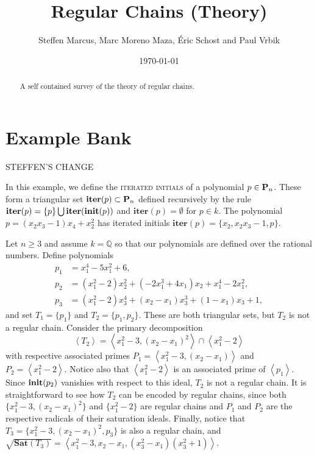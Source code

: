\documentclass[12pt]{article}
\title{Regular Chains (Theory)}
\author{Steffen Marcus, Marc Moreno Maza, \'Eric Schost and Paul Vrbik}
\date{\today}
\newcommand{\Emph}[1]{\textsc{#1}}
\begin{document}
\maketitle


\begin{abstract}
A self contained survey of the theory of regular chains.
\end{abstract}

\section*{Example Bank}
STEFFEN'S CHANGE
\begin{example}  
In this example, we define the \Emph{iterated initials} of a polynomial $p\in\mathbf{P}_n$.  These form a triangular set $\textbf{iter}(p)\subset \mathbf{P}_n$ defined recursively by the rule $\textbf{iter}(p)=\{p\}\bigcup\textbf{iter}(\textbf{init}(p))$ and $\textbf{iter}(p) = \emptyset$ for $p\in k$.  The polynomial $p=(x_2x_3-1)x_4+x_2^2$ has iterated initials $\textbf{iter}(p)=\{x_2,x_2x_3-1,p\}$.
\end{example}

\begin{example}   
Let $n\geq 3$ and assume $k=\mathbb{Q}$ so that our polynomials are defined over the rational numbers.  Define polynomials
\begin{align*}
p_1 &= x_1^4-5x_1^2+6,\\
p_2 &=(x_1^2-2)x_2^2+(-2x_1^3+4x_1)x_2+x_1^4-2x_1^2,\\
p_3 &=(x_1^2-2)x_3^4+(x_2-x_1)x_3^3+(1-x_1)x_3+1,
\end{align*}
and set $T_1=\{p_1\}$ and $T_2=\{p_1,p_2\}$.  These are both triangular sets, but $T_2$ is not a regular chain.  Consider the primary decomposition
\[
\left<T_2\right>=\left<x_1^2-3,(x_2-x_1)^2\right>\cap\left<x_1^2-2\right>
\]
with respective associated primes $P_1=\left<x_1^2-3,(x_2-x_1)\right>$ and $P_2=\left<x_1^2-2\right>.$  Notice also that $\left<x_1^2-2\right>$ is an associated prime of $\left<p_1\right>$.  Since $\textbf{init}(p_2)$ vanishies with respect to this ideal, $T_2$ is not a regular chain.  It is straightforward to see how $T_2$ can be encoded by regular chains, since both $\{x_1^2-3,(x_2-x_1)^2\}$ and $\{x_1^2-2\}$ are regular chains and $P_1$ and $P_2$ are the respective radicals of their saturation ideals.  Finally, notice that $T_3=\{x_1^2-3,(x_2-x_1)^2, p_3\}$ is also a regular chain, and $\sqrt{\textbf{Sat}(T_3)}=\left<x_1^2-3,x_2-x_1, (x_3^2-x_1)(x_3^2+1)\right>$.
\end{example}
\end{document}
